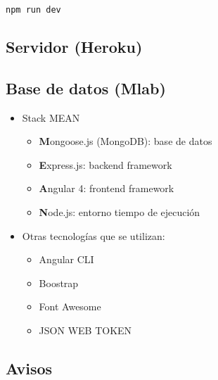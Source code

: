 	\lstset{language=C, breaklines=true, basicstyle=\footnotesize}
		\begin{lstlisting}[frame=single]
		npm run dev
    	\end{lstlisting}

\subsection{Servidor (Heroku)}

\subsection{Base de datos (Mlab)}




\begin{itemize}
  \item Stack MEAN
  \begin{itemize}
    \item \textbf{M}ongoose.js (MongoDB):  base de datos
    \item \textbf{E}xpress.js: backend framework
    \item \textbf{A}ngular 4: frontend framework
    \item \textbf{N}ode.js: entorno tiempo de ejecución
  \end{itemize}
  \item Otras tecnologías que se utilizan:
  \begin{itemize}
    \item Angular CLI
    \item Boostrap
    \item Font Awesome
    \item JSON WEB TOKEN
  \end{itemize}
\end{itemize}

\subsection{Avisos}


